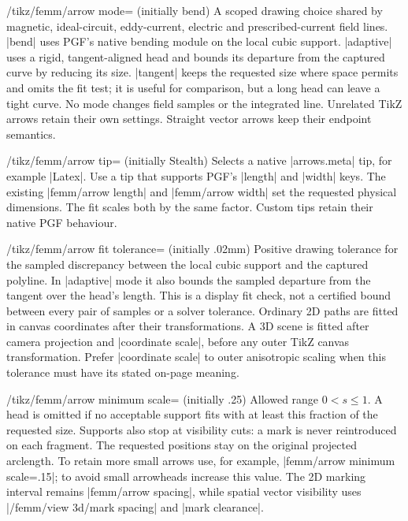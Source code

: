 \begin{key}{/tikz/femm/arrow mode= (initially bend)}
A scoped drawing choice shared by magnetic, ideal-circuit, eddy-current,
electric and prescribed-current field lines. |bend| uses PGF's native bending
module on the local cubic support. |adaptive| uses a rigid, tangent-aligned
head and bounds its departure from the captured curve by reducing its size.
|tangent| keeps the requested size where space permits and omits the fit test;
it is useful for comparison, but a long head can leave a tight curve.
No mode changes field samples or the integrated line. Unrelated TikZ arrows
retain their own settings. Straight vector arrows keep their endpoint semantics.
\end{key}
\begin{key}{/tikz/femm/arrow tip= (initially Stealth)}
Selects a native |arrows.meta| tip, for example |Latex|. Use a tip that supports
PGF's |length| and |width| keys. The existing |femm/arrow length| and
|femm/arrow width| set the requested physical dimensions. The fit scales both
by the same factor. Custom tips retain their native PGF behaviour.
\end{key}
\begin{key}{/tikz/femm/arrow fit tolerance= (initially .02mm)}
Positive drawing tolerance for the sampled discrepancy between the local cubic
support and the captured polyline. In |adaptive| mode it also bounds the sampled
departure from the tangent over the head's length. This is a display fit check,
not a certified bound between every pair of samples or a solver tolerance.
Ordinary 2D paths are fitted in canvas coordinates after their transformations.
A 3D scene is fitted after camera projection and |coordinate scale|, before any
outer TikZ canvas transformation. Prefer |coordinate scale| to outer anisotropic
scaling when this tolerance must have its stated on-page meaning.
\end{key}
\begin{key}{/tikz/femm/arrow minimum scale= (initially .25)}
Allowed range $0<s\leq1$. A head is omitted if no acceptable support fits with
at least this fraction of the requested size. Supports also stop at visibility
cuts: a mark is never reintroduced on each fragment. The requested positions
stay on the original projected arclength. To retain more small arrows use,
for example, |femm/arrow minimum scale=.15|; to avoid small arrowheads increase
this value. The 2D marking interval remains |femm/arrow spacing|, while spatial
vector visibility uses |/femm/view 3d/mark spacing| and |mark clearance|.
\end{key}

